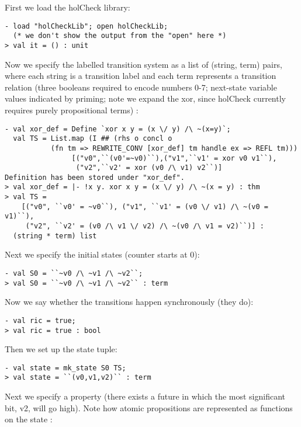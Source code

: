First we load the holCheck library:  %
\begin{session}\begin{verbatim}
- load "holCheckLib"; open holCheckLib;
  (* we don't show the output from the "open" here *)
> val it = () : unit
\end{verbatim}\end{session}
Now we specify the labelled transition system as a list of
(string, term) pairs, where each string is a transition label and
each term represents a transition relation (three booleans
required to encode numbers 0-7; next-state variable values
indicated by priming; note we expand the xor, since holCheck  %
currently requires purely propositional terms) :
\begin{session}\begin{verbatim}
- val xor_def = Define `xor x y = (x \/ y) /\ ~(x=y)`;
  val TS = List.map (I ## (rhs o concl o
           (fn tm => REWRITE_CONV [xor_def] tm handle ex => REFL tm)))
                [("v0",``(v0'=~v0)``),("v1",``v1' = xor v0 v1``),
                 ("v2",``v2' = xor (v0 /\ v1) v2``)]
Definition has been stored under "xor_def".
> val xor_def = |- !x y. xor x y = (x \/ y) /\ ~(x = y) : thm
> val TS =
    [("v0", ``v0' = ~v0``), ("v1", ``v1' = (v0 \/ v1) /\ ~(v0 = v1)``),
     ("v2", ``v2' = (v0 /\ v1 \/ v2) /\ ~(v0 /\ v1 = v2)``)] :
  (string * term) list
\end{verbatim}\end{session}
Next we specify the initial states (counter starts at 0):
\begin{session}\begin{verbatim}
- val S0 = ``~v0 /\ ~v1 /\ ~v2``;
> val S0 = ``~v0 /\ ~v1 /\ ~v2`` : term
\end{verbatim}\end{session}
Now we say whether the transitions happen synchronously (they do):
\begin{session}\begin{verbatim}
- val ric = true;
> val ric = true : bool
\end{verbatim}\end{session}
Then we set up the state tuple:
\begin{session}\begin{verbatim}
- val state = mk_state S0 TS;
> val state = ``(v0,v1,v2)`` : term
\end{verbatim}\end{session}
Next we specify a property (there exists a future in which the most significant bit, v2, will go high). Note how atomic propositions are represented as functions on the state :
